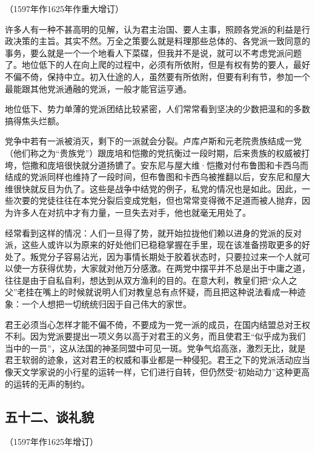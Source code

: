 \begin{center}
    （1597年作1625年作重大增订）
\end{center}
\par 许多人有一种不甚高明的见解，认为君主治国、要人主事，照顾各党派的利益是行政决策的主旨。其实不然。万全之策要么就是料理那些总体的、各党派一致同意的事务，要么就是一个一个地看人下菜碟，但我并不是说，就可以不考虑党派问题了。地位低下的人在向上爬的过程中，必须有所依附，但是有权有势的要人，最好不偏不倚，保持中立。初入仕途的人，虽然要有所依附，但要有利有节，参加一个最能跟其他党派通融的党派，一般才能官运亨通。
\par 地位低下、势力单薄的党派团结比较紧密，人们常常看到坚决的少数把温和的多数搞得焦头烂额。
\par 党争中若有一派被消灭，剩下的一派就会分裂。卢库卢斯和元老院贵族结成一党（他们称之为“贵族党”）跟庞培和恺撒的党抗衡过一段时期，后来贵族的权威被打垮，恺撒和庞培很快就分道扬镳了。安东尼与屋大维·恺撒对付布鲁图和卡西乌而结成的党派同样也维持了一段时间，但布鲁图和卡西乌被推翻以后，安东尼和屋大维很快就反目为仇了。这些是战争中结党的例子，私党的情况也是如此。因此，一些次要的党徒往往在本党分裂后变成党魁，但也常常变得微不足道而被人抛弃，因为许多人在对抗中才有力量，一旦失去对手，他也就毫无用处了。
\par 经常看到这样的情况：人们一旦得了势，就开始拉拢他们赖以进身的党派的反对派，这些人或许以为原来的好处他们已稳稳掌握在手里，现在该准备捞取更多的好处了。叛党分子容易沾光，因为事情长期处于胶着状态时，只要拉过来一个人就可以使一方获得优势，大家就对他万分感激。在两党中摆平并不总是出于中庸之道，往往是由于自私自利，想达到从双方渔利的目的。在意大利，教皇们把“众人之父”老挂在嘴上的时候就说明人们对教皇总有点怀疑，而且把这种说法看成一种迹象：一个人想把一切统统归因于自己伟大的家世。
\par 君王必须当心怎样才能不偏不倚，不要成为一党一派的成员，在国内结盟总对王权不利。因为党派要提出一项义务以高于对君王的义务，而且使君王“似乎成为我们当中的一员”，这从法国的神圣同盟中可见一斑。党争气焰高涨，激烈无比，就是君王软弱的迹象，这对君王的权威和事业都是一种侵犯。君王之下的党派活动应当像天文学家说的小行星的运转一样，它们进行自转，但仍然受“初始动力”这种更高的运转的无声的制约。



\subsection*{五十二、谈礼貌}
\begin{center}
    （1597年作1625年增订）
\end{center}

